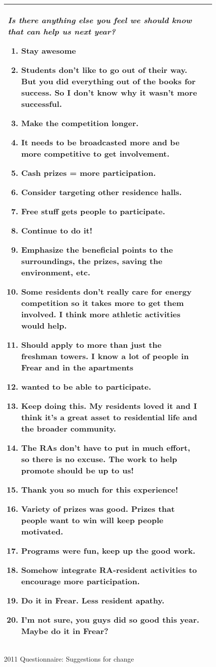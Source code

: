 \documentclass[]{article}
\begin{document}
\begin{figure*}[th!]
\begin{tabular}{|l|l|}
\small  \begin{minipage}[t]{2.75in}
{\em Is there anything else you feel we should know that can help us next year?  }
\begin{enumerate}
\item Stay awesome
\item Students don't like to go out of their way.  But you did everything out of the books
  for success. So I don't know why it wasn't more successful.
\item Make the competition longer. 
\item It needs to be broadcasted more and be more competitive to get involvement. 
\item Cash prizes = more participation.
\item Consider targeting other residence halls. 
\item Free stuff gets people to participate.
\item Continue to do it!
\item Emphasize the beneficial points to the surroundings, the prizes, saving the environment, etc. 
\item Some residents don't really care for energy competition so it takes more to get them involved.   I think more 
athletic activities would help.
\item Should apply to more than just the freshman towers.  I know a lot of people in Frear and in the apartments 
\item wanted to be able to participate.
\item Keep doing this. My residents  loved it and I think it's a great asset to residential life and the broader community.
\item The RAs don't have to put in much effort, so there is no excuse.  The work to help promote should be up to us!  
\item Thank you so much for this experience!
\item Variety of prizes was good.  Prizes that people want to win will keep people motivated.
\item Programs were fun, keep up the good work.
\item Somehow integrate RA-resident activities to encourage more participation.
\item Do it in Frear.  Less resident apathy.
\item I'm not sure, you guys did so good this year.  Maybe do it in Frear?
\end{enumerate}
\end{minipage}  \normalsize
\\
\hline
\end{tabular}
\caption{2011 Questionnaire: Suggestions for change}
\label{fig:ra-suggestions-2011}
\end{figure*}
\end{document}
